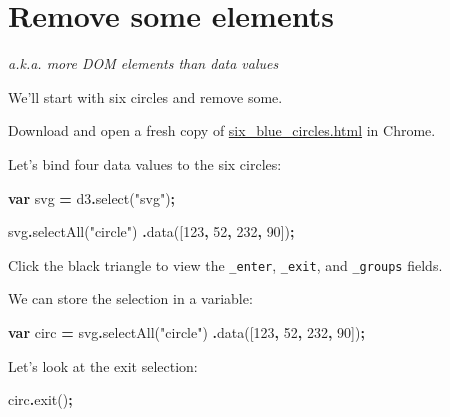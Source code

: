 \documentclass[
  openany]{book}
\newenvironment{Shaded}{\begin{snugshade}}{\end{snugshade}}
\newcommand{\DecValTok}[1]{\textcolor[rgb]{0.00,0.00,0.81}{#1}}
\newcommand{\FunctionTok}[1]{\textcolor[rgb]{0.00,0.00,0.00}{#1}}
\newcommand{\KeywordTok}[1]{\textcolor[rgb]{0.13,0.29,0.53}{\textbf{#1}}}
\newcommand{\NormalTok}[1]{#1}
\newcommand{\OperatorTok}[1]{\textcolor[rgb]{0.81,0.36,0.00}{\textbf{#1}}}
\newcommand{\StringTok}[1]{\textcolor[rgb]{0.31,0.60,0.02}{#1}}
\begin{document}
\hypertarget{remove-some-elements}{%
\section{\texorpdfstring{Remove some elements }{Remove some elements }}\label{remove-some-elements}}

\emph{a.k.a. more DOM elements than data values}

We'll start with six circles and remove some.

Download and open a fresh copy of \href{https://raw.githubusercontent.com/jtr13/d3book/master/code/six_blue_circles.html}{six\_blue\_circles.html} in Chrome.

Let's bind four data values to the six circles:

\begin{Shaded}
\begin{Highlighting}[]
\KeywordTok{var}\NormalTok{ svg }\OperatorTok{=}\NormalTok{ d3}\OperatorTok{.}\FunctionTok{select}\NormalTok{(}\StringTok{"svg"}\NormalTok{)}\OperatorTok{;}

\NormalTok{svg}\OperatorTok{.}\FunctionTok{selectAll}\NormalTok{(}\StringTok{"circle"}\NormalTok{)}
    \OperatorTok{.}\FunctionTok{data}\NormalTok{([}\DecValTok{123}\OperatorTok{,} \DecValTok{52}\OperatorTok{,} \DecValTok{232}\OperatorTok{,} \DecValTok{90}\NormalTok{])}\OperatorTok{;}
\end{Highlighting}
\end{Shaded}

Click the black triangle to view the \texttt{\_enter}, \texttt{\_exit}, and \texttt{\_groups} fields.

We can store the selection in a variable:

\begin{Shaded}
\begin{Highlighting}[]
\KeywordTok{var}\NormalTok{ circ }\OperatorTok{=}\NormalTok{ svg}\OperatorTok{.}\FunctionTok{selectAll}\NormalTok{(}\StringTok{"circle"}\NormalTok{)}
    \OperatorTok{.}\FunctionTok{data}\NormalTok{([}\DecValTok{123}\OperatorTok{,} \DecValTok{52}\OperatorTok{,} \DecValTok{232}\OperatorTok{,} \DecValTok{90}\NormalTok{])}\OperatorTok{;}
\end{Highlighting}
\end{Shaded}

Let's look at the exit selection:

\begin{Shaded}
\begin{Highlighting}[]
\NormalTok{circ}\OperatorTok{.}\FunctionTok{exit}\NormalTok{()}\OperatorTok{;}
\end{Highlighting}
\end{Shaded}
\end{document}
